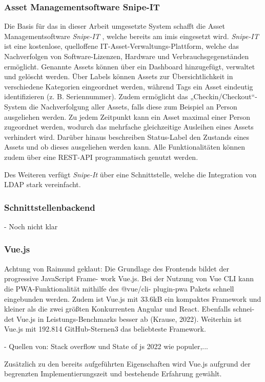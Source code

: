 \subsubsection{Asset Managementsoftware Snipe-IT}
Die Basis für das in dieser Arbeit umgesetzte System schafft die Asset
Managementsoftware \textit{Snipe-IT} \cite{noauthor_home_nodate}, welche bereits
am \ac{imis} eingesetzt wird. \textit{Snipe-IT} ist eine kostenlose, quelloffene
IT-Asset-Verwaltungs-Plattform, welche das Nachverfolgen von Software-Lizenzen,
Hardware und Verbrauchsgegenständen ermöglicht. Genannte Assets können über ein
Dashboard hinzugefügt, verwaltet und gelöscht werden. Über Labels können Assets
zur Übersichtlichkeit in verschiedene Kategorien eingeordnet werden, während
Tags ein Asset eindeutig identifizieren (z. B. Seriennummer). Zudem ermöglicht
das „Checkin/Checkout“-System die Nachverfolgung aller Assets, falls diese zum
Beispiel an Person ausgeliehen werden. Zu jedem Zeitpunkt kann ein Asset maximal
einer Person zugeordnet werden, wodurch das mehrfache gleichzeitige Ausleihen
eines Assets verhindert wird. Darüber hinaus beschreiben Status-Label den
Zustands eines Assets und ob dieses ausgeliehen werden kann. Alle
Funktionalitäten können zudem über eine REST-API programmatisch genutzt werden.

Des Weiteren verfügt \textit{Snipe-It} über eine Schnittstelle, welche die
Integration von LDAP stark vereinfacht.
\subsubsection{Schnittstellenbackend}
- Noch nicht klar

\subsubsection{Vue.js}
Achtung von Raimund geklaut: Die Grundlage des Frontends bildet der progressive
JavaScript Frame- work Vue.js. Bei der Nutzung von Vue CLI kann die
PWA-Funktionalität mithilfe des @vue/cli- plugin-pwa Pakets schnell eingebunden
werden. Zudem ist Vue.js mit 33.6kB ein kompaktes Framework und kleiner als die
zwei größten Konkurrenten Angular und React. Ebenfalls schnei- det Vue.js in
Leistungs-Benchmarks besser ab (Krause, 2022). Weiterhin ist Vue.js mit 192.814
GitHub-Sternen3 das beliebteste Framework.

- Quellen von: Stack overflow und State of js 2022 wie populer,...

Zusätzlich zu den bereits aufgeführten Eigenschaften wird Vue.js aufgrund
der begrenzten Implementierungszeit und bestehende Erfahrung gewählt.

